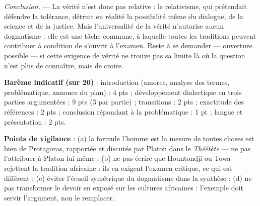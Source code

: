 \documentclass[11pt]{article}
\begin{document}
\begin{corrige}
\emph{Conclusion.} --- La vérité n'est donc pas relative : le relativisme, qui prétendait défendre la tolérance, détruit en réalité la possibilité même du dialogue, de la science et de la justice. Mais l'universalité de la vérité n'autorise aucun dogmatisme : elle est une tâche commune, à laquelle toutes les traditions peuvent contribuer à condition de s'ouvrir à l'examen. Reste à se demander --- ouverture possible --- si cette exigence de vérité ne trouve pas sa limite là où la question n'est plus de connaître, mais de croire.

\textbf{Barème indicatif (sur 20)} : introduction (amorce, analyse des termes, problématique, annonce du plan) : 4 pts ; développement dialectique en trois parties argumentées : 9 pts (3 par partie) ; transitions : 2 pts ; exactitude des références : 2 pts ; conclusion répondant à la problématique : 1 pt ; langue et présentation : 2 pts.

\textbf{Points de vigilance} : (a) la formule \guillemotleft l'homme est la mesure de toutes choses \guillemotright est bien de Protagoras, rapportée et discutée par Platon dans le \emph{Théétète} --- ne pas l'attribuer à Platon lui-même ; (b) ne pas écrire que Hountondji ou Towa \guillemotleft rejettent la tradition africaine \guillemotright : ils en exigent l'examen critique, ce qui est différent ; (c) éviter l'écueil symétrique du dogmatisme dans la synthèse ; (d) ne pas transformer le devoir en exposé sur les cultures africaines : l'exemple doit servir l'argument, non le remplacer.
\end{corrige}
\end{document}
